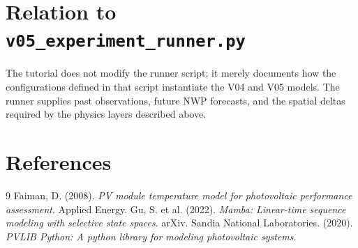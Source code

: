 \documentclass{article}
\begin{document}
\section{Relation to \texttt{v05_experiment_runner.py}}
The tutorial does not modify the runner script; it merely documents how the configurations defined in that script instantiate the V04 and V05 models. The runner supplies past observations, future NWP forecasts, and the spatial deltas required by the physics layers described above.

\section{References}
\begin{thebibliography}{9}
 Faiman, D. (2008). \textit{PV module temperature model for photovoltaic performance assessment}. Applied Energy.
 Gu, S. et al. (2022). \textit{Mamba: Linear-time sequence modeling with selective state spaces}. arXiv.
 Sandia National Laboratories. (2020). \textit{PVLIB Python: A python library for modeling photovoltaic systems}.
\end{thebibliography}
\end{document}
